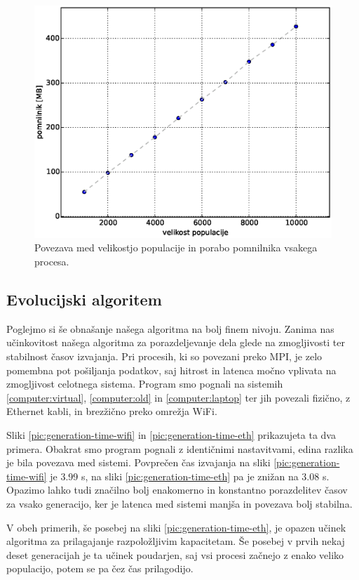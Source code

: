 \documentclass[a4paper,12pt]{book}
\begin{document}
\begin{figure}
	\centering
	\includegraphics[scale=0.5]{res/population-ram.eps}
	\caption{Povezava med velikostjo populacije in porabo pomnilnika vsakega procesa. }
	\label{pic:population-ram}
\end{figure}


\subsection{Evolucijski algoritem}
Poglejmo si še obnašanje našega algoritma na bolj finem nivoju. Zanima nas učinkovitost našega algoritma za porazdeljevanje dela glede na zmogljivosti ter stabilnost časov izvajanja. Pri procesih, ki so povezani preko MPI, je zelo pomembna pot pošiljanja podatkov, saj hitrost in latenca močno vplivata na zmogljivost celotnega sistema. Program smo pognali na sistemih \ref{computer:virtual}, \ref{computer:old} in \ref{computer:laptop} ter jih povezali fizično, z Ethernet kabli, in brezžično preko omrežja WiFi. 

Sliki \ref{pic:generation-time-wifi} in \ref{pic:generation-time-eth} prikazujeta ta dva primera. Obakrat smo program pognali z identičnimi nastavitvami, edina razlika je bila povezava med sistemi. Povprečen čas izvajanja na sliki \ref{pic:generation-time-wifi} je 3.99 s, na sliki \ref{pic:generation-time-eth} pa je znižan na 3.08 s. Opazimo lahko tudi značilno bolj enakomerno in konstantno porazdelitev časov za vsako generacijo, ker je latenca med sistemi manjša in povezava bolj stabilna. 

V obeh primerih, še posebej na sliki \ref{pic:generation-time-eth}, je opazen učinek algoritma za prilagajanje razpoložljivim kapacitetam. Še posebej v prvih nekaj deset generacijah je ta učinek poudarjen, saj vsi procesi začnejo z enako veliko populacijo, potem se pa čez čas prilagodijo. 
\end{document}
